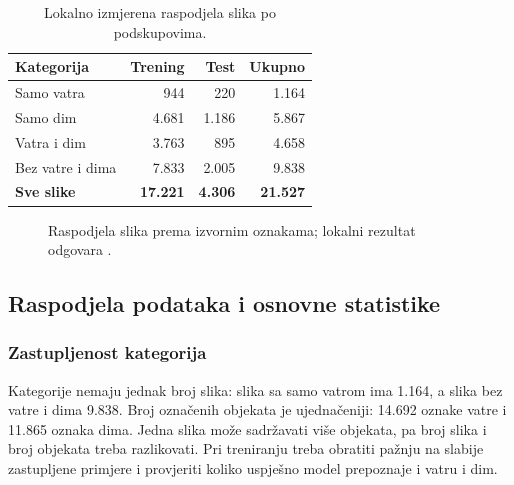 \begin{table}[H]
\centering
\small
\begin{tabular}{@{}lrrr@{}}
\toprule
\textbf{Kategorija} & \textbf{Trening} & \textbf{Test} & \textbf{Ukupno}\\
\midrule
Samo vatra & 944 & 220 & 1.164\\
Samo dim & 4.681 & 1.186 & 5.867\\
Vatra i dim & 3.763 & 895 & 4.658\\
Bez vatre i dima & 7.833 & 2.005 & 9.838\\
\midrule
\textbf{Sve slike} & \textbf{17.221} & \textbf{4.306} & \textbf{21.527}\\
\bottomrule
\end{tabular}
\caption{Lokalno izmjerena raspodjela slika po podskupovima.}
\label{tab:prof-podskupovi}
\end{table}

\begin{figure}[H]
\centering
{}
\caption{Raspodjela slika prema izvornim oznakama; lokalni rezultat odgovara \cite{dfire}.}
\label{fig:prof-raspodjela}
\end{figure}

\subsection{Raspodjela podataka i osnovne statistike}

\subsubsection{Zastupljenost kategorija}
Kategorije nemaju jednak broj slika: slika sa samo vatrom ima 1.164, a slika bez vatre i dima 9.838. Broj označenih objekata je ujednačeniji: 14.692 oznake vatre i 11.865 oznaka dima. Jedna slika može sadržavati više objekata, pa broj slika i broj objekata treba razlikovati. Pri treniranju treba obratiti pažnju na slabije zastupljene primjere i provjeriti koliko uspješno model prepoznaje i vatru i dim.


